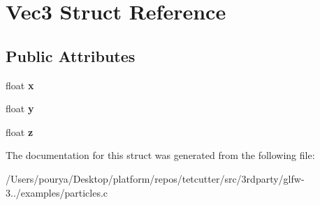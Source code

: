 \hypertarget{structVec3}{}\section{Vec3 Struct Reference}
\label{structVec3}
\subsection*{Public Attributes}
\begin{DoxyCompactItemize}
\item 
\hypertarget{structVec3_a2814580e9b9372738c0a61197ea46b51}{}float {\bfseries x}\label{structVec3_a2814580e9b9372738c0a61197ea46b51}

\item 
\hypertarget{structVec3_abc1d241232cb04aa98217a942402ae68}{}float {\bfseries y}\label{structVec3_abc1d241232cb04aa98217a942402ae68}

\item 
\hypertarget{structVec3_a64f3f00cd2dd9076999eeb2f05210388}{}float {\bfseries z}\label{structVec3_a64f3f00cd2dd9076999eeb2f05210388}

\end{DoxyCompactItemize}


The documentation for this struct was generated from the following file\+:\begin{DoxyCompactItemize}
\item 
/\+Users/pourya/\+Desktop/platform/repos/tetcutter/src/3rdparty/glfw-\/3../examples/particles.\+c\end{DoxyCompactItemize}
